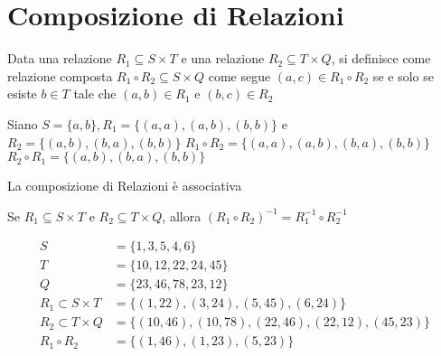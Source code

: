 \section{Composizione di Relazioni}
Data una relazione $R_1 \subseteq S \times T$ e una relazione $R_2 \subseteq T \times Q$,
si definisce come relazione composta $R_1 \circ R_2 \subseteq S \times Q$ come segue
$(a,c) \in R_1 \circ R_2$ se e solo se  esiste $b \in T$ tale che $(a,b) \in R_1$ e $(b,c) \in R_2$

Siano $S = \{ a,b \}, R_1 = \{ (a,a),(a,b),(b,b) \}$ e $R_2 = \{ (a,b),(b,a),(b,b) \}$
$R_1 \circ R_2 = \{ (a,a),(a,b),(b,a),(b,b) \}$ \newline
$R_2 \circ R_1 = \{ (a,b),(b,a),(b,b) \}$

\begin{prop}
La composizione di Relazioni è associativa
\end{prop}

\begin{thm}
Se $R_1 \subseteq S \times T$ e $R_2 \subseteq T \times Q$, allora $(R_1 \circ R_2)^{-1} = R_1^{-1} \circ R_2^{-1}$
\end{thm}


\begin{equation*}
\begin{split}
S & = \{ 1,3,5,4,6\}\\
T & = \{10,12,22,24,45\}\\ 
Q & = \{23,46,78,23,12\} \\
R_1 \subset S \times T & = \{(1,22),(3,24),(5,45),(6,24)\} \\
R_2 \subset T \times Q & = \{(10,46),(10,78),(22,46),(22,12),(45,23)\} \\
R_1 \circ R_2 & = \{(1,46),(1,23),(5,23)\} \\
\end{split}
\end{equation*}

